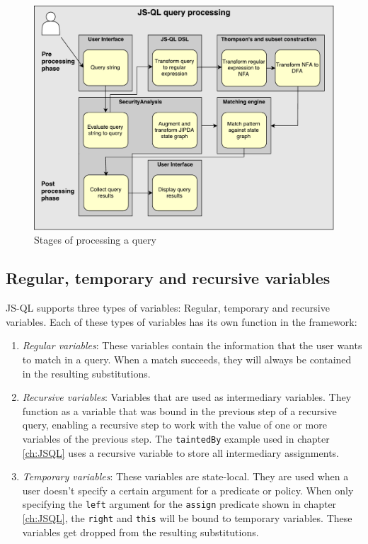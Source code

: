 \begin{figure}[!h]
    \centering
      \includegraphics[width=1\textwidth]{images/QueryProcessing} 
      \caption{Stages of processing a query}
    \label{fig:QueryProcessing}
\end{figure}

\subsection*{Regular, temporary and recursive variables}

JS-QL supports three types of variables: Regular, temporary and recursive variables. Each of these types of variables has its own function in the framework:
\begin{enumerate}
\item \textit{Regular variables}: These variables contain the information that the user wants to match in a query. When a match succeeds, they will always be contained in the resulting substitutions.
\item \textit{Recursive variables}: Variables that are used as intermediary variables. They function as a variable that was bound in the previous step of a recursive query, enabling a recursive step to work with the value of one or more variables of the previous step. The \texttt{taintedBy} example used in chapter \ref{ch:JSQL} uses a recursive variable to store all intermediary assignments.
\item \textit{Temporary variables}: These variables are state-local. They are used when a user doesn't specify a certain argument for a predicate or policy. When only specifying the \texttt{left} argument for the \texttt{assign} predicate shown in chapter \ref{ch:JSQL}, the \texttt{right} and \texttt{this} will be bound to temporary variables. These variables get dropped from the resulting substitutions.
\end{enumerate}

